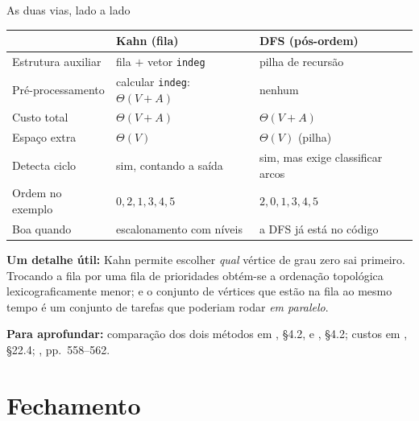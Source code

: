 \documentclass[aspectratio=169]{beamer}
\newcommand{\fonte}[1]{%
  \vfill
  {\tiny\color{gray!55!black}\textbf{Para aprofundar:} #1\par}%
}
\begin{document}
\begin{frame}{As duas vias, lado a lado}
  \begin{center}
  {\scriptsize
  \begin{tabular}{lll}
    \toprule
     & \textbf{Kahn (fila)} & \textbf{DFS (pós-ordem)} \\
    \midrule
    Estrutura auxiliar   & fila $+$ vetor \texttt{indeg}  & pilha de recursão \\
    Pré-processamento    & calcular \texttt{indeg}: $\Theta(V+A)$ & nenhum \\
    Custo total          & $\Theta(V+A)$                  & $\Theta(V+A)$ \\
    Espaço extra         & $\Theta(V)$                    & $\Theta(V)$ (pilha) \\
    Detecta ciclo        & sim, contando a saída          & sim, mas exige
                                                            classificar arcos \\
    Ordem no exemplo     & $0,2,1,3,4,5$                  & $2,0,1,3,4,5$ \\
    Boa quando           & escalonamento com níveis        & a DFS já está no código \\
    \bottomrule
  \end{tabular}}
  \end{center}
  \medskip
  {\scriptsize \textbf{Um detalhe útil:} Kahn permite escolher \emph{qual}
  vértice de grau zero sai primeiro. Trocando a fila por uma fila de
  prioridades obtém-se a ordenação topológica lexicograficamente menor; e o
  conjunto de vértices que estão na fila ao mesmo tempo é um conjunto de
  tarefas que poderiam rodar \emph{em paralelo}.}
  \fonte{comparação dos dois métodos em \cite{levitin2012introduction}, §4.2, e
  \cite{sedgewick2011algorithms}, §4.2; custos em
  \cite{cormen2009introduction}, §22.4; \cite{kahn1962topological}, pp.~558--562.}
\end{frame}

\section{Fechamento}
\end{document}
